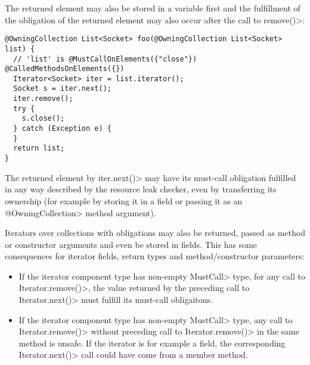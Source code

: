 The returned element may also be stored in a variable first and the fulfillment of the obligation of the returned element may also occur after the call to \<remove()>:

\begin{verbatim}
@OwningCollection List<Socket> foo(@OwningCollection List<Socket> list) {
  // 'list' is @MustCallOnElements({"close"}) @CalledMethodsOnElements({})
  Iterator<Socket> iter = list.iterator();
  Socket s = iter.next();
  iter.remove();
  try {
    s.close();
  } catch (Exception e) {
  }
  return list;
}
\end{verbatim}

The returned element by \<iter.next()> may have its must-call obligation fulfilled in any way described by the resource leak checker, even by transferring its ownership (for example by storing it in a field or passing it as an \<@OwningCollection> method argument).

Iterators over collections with obligations may also be returned, passed as method or constructor arguments and even be stored in fields. This has some consequences for iterator fields, return types and method/constructor parameters:
\begin{itemize}
  \item If the iterator component type has non-empty \<MustCall> type, for any call to \<Iterator.remove()>, the value returned by the preceding call to \<Iterator.next()> must fulfill its must-call obligaitons.
  \item If the iterator component type has non-empty \<MustCall> type, any call to \<Iterator.remove()> without preceding call to \<Iterator.remove()> in the same method is unsafe. If the iterator is for example a field, the corresponding \<Iterator.next()> call could have come from a member method.
\end{itemize}




